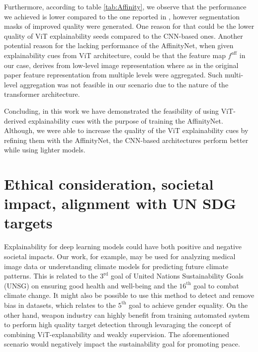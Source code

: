 \documentclass{article}
\begin{document}
Furthermore, according to table \ref{tab:Affinity}, we observe that the performance we achieved is lower compared to the one reported in \cite{ahn2018learning}, however segmentation masks of improved quality were generated. One reason for that could be the lower quality of ViT explainability seeds compared to the CNN-based ones. Another potential reason for the lacking performance of the AffinityNet, when given explainability cues from ViT architecture, could be that the feature map $f^\text{aff}$ in our case, derives from low-level image representation where as in the original paper \cite{ahn2018learning} feature representation from multiple levels were aggregated. Such multi-level aggregation was not feasible in our scenario due to the nature of the transformer architecture. 

Concluding, in this work we have demonstrated the feasibility of using ViT-derived explainability cues with the purpose of training the AffinityNet. Although, we were able to increase the quality of the ViT explainability cues by refining them with the AffinityNet, the CNN-based architectures perform better while using lighter models.



\section{Ethical consideration, societal impact, alignment with UN SDG targets}

Explainability for deep learning models could have both positive and negative societal impacts. Our work, for example, may be used for analyzing medical image data or understanding climate models for predicting future climate patterns. This is related to the $3^\text{rd}$ goal of United Nations Sustainability Goals (UNSG) on ensuring good health and well-being and the $16^\text{th}$ goal to combat climate change. It might also be possible to use this method to detect and remove bias in datasets, which relates to the $5^\text{th}$ goal to achieve gender equality. On the other hand, weapon industry can highly benefit from training automated system to perform high quality target detection through levaraging the concept of combining ViT-explanability and weakly supervision. The aforementioned scenario would negatively impact the sustainability goal for promoting peace.
\end{document}
